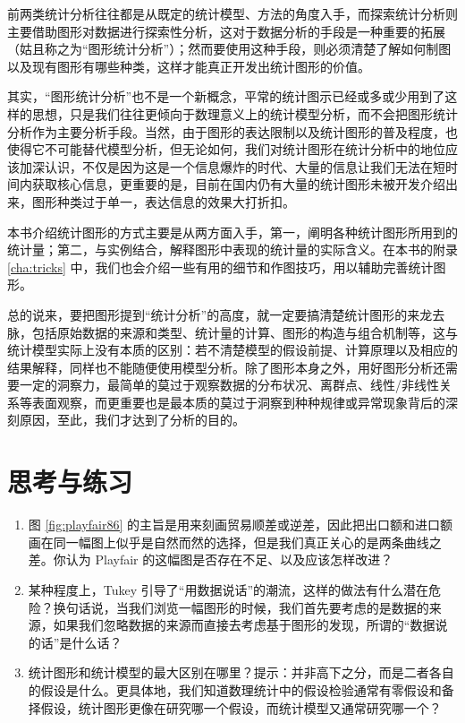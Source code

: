 \documentclass[
  b5paper,
  UTF8,twoside]{book}
\begin{document}
前两类统计分析往往都是从既定的统计模型、方法的角度入手，而探索统计分析则主要借助图形对数据进行探索性分析，这对于数据分析的手段是一种重要的拓展（姑且称之为``图形统计分析''）；然而要使用这种手段，则必须清楚了解如何制图以及现有图形有哪些种类，这样才能真正开发出统计图形的价值。

其实，``图形统计分析''也不是一个新概念，平常的统计图示已经或多或少用到了这样的思想，只是我们往往更倾向于数理意义上的统计模型分析，而不会把图形统计分析作为主要分析手段。当然，由于图形的表达限制以及统计图形的普及程度，也使得它不可能替代模型分析，但无论如何，我们对统计图形在统计分析中的地位应该加深认识，不仅是因为这是一个信息爆炸的时代、大量的信息让我们无法在短时间内获取核心信息，更重要的是，目前在国内仍有大量的统计图形未被开发介绍出来，图形种类过于单一，表达信息的效果大打折扣。

本书介绍统计图形的方式主要是从两方面入手，第一，阐明各种统计图形所用到的统计量；第二，与实例结合，解释图形中表现的统计量的实际含义。在本书的附录 \ref{cha:tricks} 中，我们也会介绍一些有用的细节和作图技巧，用以辅助完善统计图形。

总的说来，要把图形提到``统计分析''的高度，就一定要搞清楚统计图形的来龙去脉，包括原始数据的来源和类型、统计量的计算、图形的构造与组合机制等，这与统计模型实际上没有本质的区别：若不清楚模型的假设前提、计算原理以及相应的结果解释，同样也不能随便使用模型分析。除了图形本身之外，用好图形分析还需要一定的洞察力，最简单的莫过于观察数据的分布状况、离群点、线性/非线性关系等表面观察，而更重要也是最本质的莫过于洞察到种种规律或异常现象背后的深刻原因，至此，我们才达到了分析的目的。

\section{思考与练习}\label{ux601dux8003ux4e0eux7ec3ux4e60}

\begin{enumerate}
\def\labelenumi{\arabic{enumi}.}
\item
  图 \ref{fig:playfair86} 的主旨是用来刻画贸易顺差或逆差，因此把出口额和进口额画在同一幅图上似乎是自然而然的选择，但是我们真正关心的是两条曲线之差。你认为 Playfair 的这幅图是否存在不足、以及应该怎样改进？
\item
  某种程度上，Tukey 引导了``用数据说话''的潮流，这样的做法有什么潜在危险？换句话说，当我们浏览一幅图形的时候，我们首先要考虑的是数据的来源，如果我们忽略数据的来源而直接去考虑基于图形的发现，所谓的``数据说的话''是什么话？
\item
  统计图形和统计模型的最大区别在哪里？提示：并非高下之分，而是二者各自的假设是什么。更具体地，我们知道数理统计中的假设检验通常有零假设和备择假设，统计图形更像在研究哪一个假设，而统计模型又通常研究哪一个？
\end{enumerate}
\end{document}
